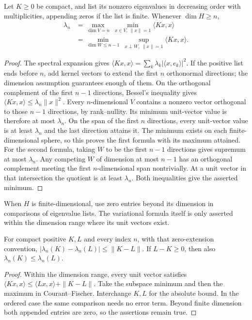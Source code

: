 \begin{theorem}\label{thm:minmax}
Let $K\ge0$ be compact, and list its nonzero eigenvalues in decreasing order with multiplicities, appending zeros if the list is finite. Whenever $\dim H\ge n$,
\[
\begin{aligned}
\lambda_n&=\max_{\dim V=n}\ \min_{x\in V,\ \|x\|=1}\langle Kx,x\rangle\\
&=\min_{\dim W\le n-1}\ \sup_{x\perp W,\ \|x\|=1}\langle Kx,x\rangle.
\end{aligned}
\]
\end{theorem}
\begin{proof}
The spectral expansion gives $\langle Kx,x\rangle=\sum_k\lambda_k|\langle x,e_k\rangle|^2$. If the positive list ends before $n$, add kernel vectors to extend the first $n$ orthonormal directions; the dimension assumption guarantees enough of them. On the orthogonal complement of the first $n-1$ directions, Bessel's inequality gives $\langle Kx,x\rangle\le\lambda_n\|x\|^2$.
Every $n$-dimensional $V$ contains a nonzero vector orthogonal to those $n-1$ directions, by rank--nullity. Its minimum unit-vector value is therefore at most $\lambda_n$. On the span of the first $n$ directions, every unit-vector value is at least $\lambda_n$ and the last direction attains it. The minimum exists on each finite-dimensional sphere, so this proves the first formula with its maximum attained.
For the second formula, taking $W$ to be the first $n-1$ directions gives supremum at most $\lambda_n$. Any competing $W$ of dimension at most $n-1$ has an orthogonal complement meeting the first $n$-dimensional span nontrivially. At a unit vector in that intersection the quotient is at least $\lambda_n$. Both inequalities give the asserted minimum.
\end{proof}

When $H$ is finite-dimensional, use zero entries beyond its dimension in comparisons of eigenvalue lists. The variational formula itself is only asserted within the dimension range where its unit vectors exist.

\begin{corollary}\label{cor:weylpert}
For compact positive $K,L$ and every index $n$, with that zero-extension convention,
$|\lambda_n(K)-\lambda_n(L)|\le\|K-L\|$.
If $L-K\ge0$, then also $\lambda_n(K)\le\lambda_n(L)$.
\end{corollary}
\begin{proof}
Within the dimension range, every unit vector satisfies
$\langle Kx,x\rangle\le\langle Lx,x\rangle+\|K-L\|$.
Take the subspace minimum and then the maximum in Courant--Fischer. Interchange $K,L$ for the absolute bound. In the ordered case the same comparison needs no error term. Beyond finite dimension both appended entries are zero, so the assertions remain true.
\end{proof}

